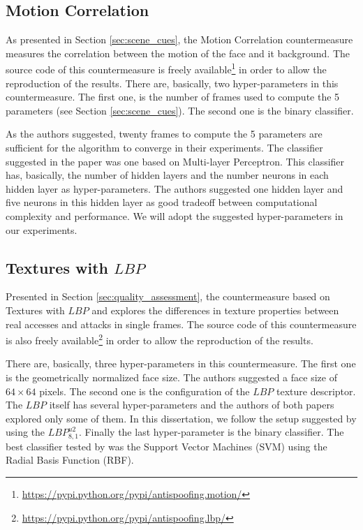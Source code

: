 \subsection{Motion Correlation}

As presented in Section \ref{sec:scene_cues}, the Motion Correlation \cite{AnjosIJCB2011} countermeasure measures the correlation between the motion of the face and it background. The source code of this countermeasure is freely available\footnote{\url{https://pypi.python.org/pypi/antispoofing.motion/}} in order to allow the reproduction of the results. There are, basically, two hyper-parameters in this countermeasure. The first one, is the number of frames used to compute the 5 parameters (see Section \ref{sec:scene_cues}). The second one is the binary classifier.

As the authors suggested, twenty frames to compute the 5 parameters are sufficient for the algorithm to converge in their experiments. The classifier suggested in the paper was one based on Multi-layer Perceptron. This classifier has, basically, the number of hidden layers and the number neurons in each hidden layer as hyper-parameters. The authors suggested one hidden layer and five neurons in this hidden layer as good tradeoff between computational complexity and performance. We will adopt the suggested hyper-parameters in our experiments.

\subsection{Textures with $LBP$}

Presented in Section \ref{sec:quality_assessment}, the countermeasure based on Textures with $LBP$ \cite{ChingovskaBIOSIG2012} and \cite{maatta2011face} explores the differences in texture properties between real accesses and attacks in single frames. The source code of this countermeasure is also freely available\footnote{\url{https://pypi.python.org/pypi/antispoofing.lbp/}} in order to allow the reproduction of the results.

There are, basically, three hyper-parameters in this countermeasure. The first one is the geometrically normalized face size. The authors suggested a face size of $64 \times 64$ pixels. The second one is the configuration of the $LBP$ texture descriptor. The $LBP$ itself has several hyper-parameters \cite{inen2011computer} and the authors of both papers explored only some of them. In this dissertation, we follow the setup suggested by \cite{ChingovskaBIOSIG2012} using the $LBP_{8,1}^{u2}$. Finally the last hyper-parameter is the binary classifier. The best classifier tested by \cite{ChingovskaBIOSIG2012} was the Support Vector Machines (SVM) using the Radial Basis Function (RBF). 

